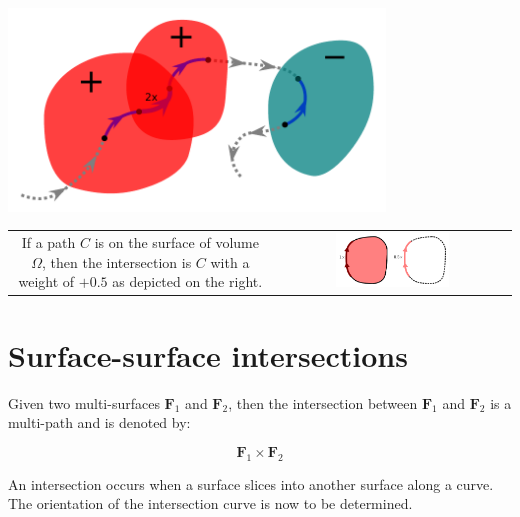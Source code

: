 \begin{center}
\includegraphics[width = 0.75\textwidth]{Intersections/Path-volume_intersections/path_volume_intersections_example_3}
\end{center}


\begin{tabular}{cc}
\parbox{0.5\textwidth}{
If a path \(C\) is on the surface of volume \(\Omega\), then the intersection is \(C\) with a weight of \(+0.5\) as depicted on the right.
} & \parbox{0.5\textwidth}{
\includegraphics[width = 0.5\textwidth]{Intersections/Path-volume_intersections/path_volume_intersection_boundary_case}
}
\end{tabular}






\section{Surface-surface intersections}

Given two multi-surfaces \(\mathbf{F}_1\) and \(\mathbf{F}_2\), then the intersection between \(\mathbf{F}_1\) and \(\mathbf{F}_2\) is a multi-path and is denoted by:

\[\mathbf{F}_1 \times \mathbf{F}_2\]

An intersection occurs when a surface slices into another surface along a curve. The orientation of the intersection curve is now to be determined. 

